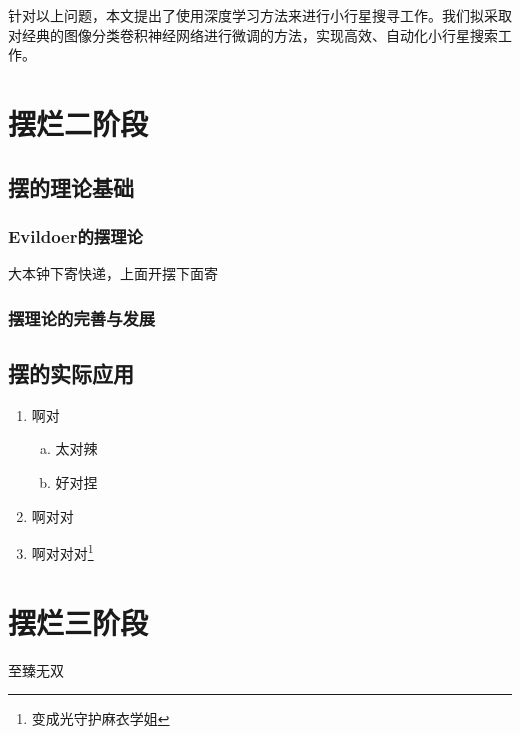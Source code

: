\documentclass[12pt,a4paper]{article}%
\begin{document}
针对以上问题，本文提出了使用深度学习方法来进行小行星搜寻工作。我们拟采取对经典的图像分类卷积神经网络进行微调的方法，实现高效、自动化小行星搜索工作。

\section{}



\section{摆烂二阶段}
\subsection{摆的理论基础}
\subsubsection{Evildoer的摆理论}
大本钟下寄快递，上面开摆下面寄
\subsubsection{摆理论的完善与发展}
\subsection{摆的实际应用}
\begin{enumerate}[1.]%
    \item 啊对
          \begin{enumerate}[(a)]%
              \item 太对辣
              \item 好对捏
          \end{enumerate}
    \item 啊对对
    \item 啊对对对\footnote{变成光守护麻衣学姐}%
\end{enumerate}

\section{摆烂三阶段}
至臻无双 \cite{remillard_x-ray_2006}

\newpage



\end{document}
